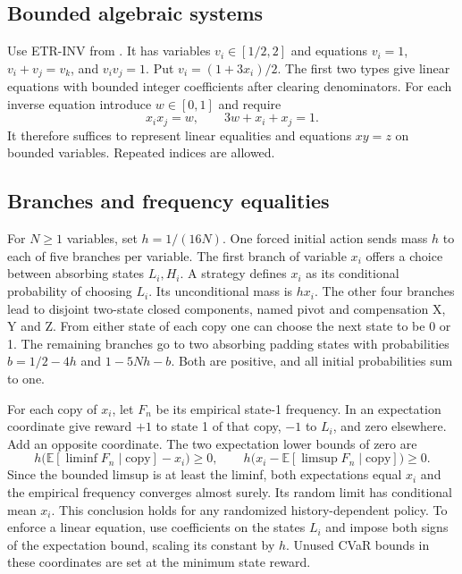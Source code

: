 \documentclass[11pt,a4paper]{amsart}
\begin{document}
\subsection{Bounded algebraic systems}
Use ETR-INV from \cite[Definition~14 and Theorem~16]{aam}. It has variables \(v_i\in[1/2,2]\) and equations \(v_i=1\), \(v_i+v_j=v_k\), and \(v_i v_j=1\). Put \(v_i=(1+3x_i)/2\). The first two types give linear equations with bounded integer coefficients after clearing denominators. For each inverse equation introduce \(w\in[0,1]\) and require
\[
 x_i x_j=w,\qquad 3w+x_i+x_j=1 .
\]
It therefore suffices to represent linear equalities and equations \(xy=z\) on bounded variables. Repeated indices are allowed.

\subsection{Branches and frequency equalities}
For \(N\ge1\) variables, set \(h=1/(16N)\). One forced initial action sends mass \(h\) to each of five branches per variable. The first branch of variable \(x_i\) offers a choice between absorbing states \(L_i,H_i\). A strategy defines \(x_i\) as its conditional probability of choosing \(L_i\). Its unconditional mass is \(hx_i\). The other four branches lead to disjoint two-state closed components, named pivot and compensation X, Y and Z. From either state of each copy one can choose the next state to be 0 or 1. The remaining branches go to two absorbing padding states with probabilities \(b=1/2-4h\) and \(1-5Nh-b\). Both are positive, and all initial probabilities sum to one.

For each copy of \(x_i\), let \(F_n\) be its empirical state-1 frequency. In an expectation coordinate give reward \(+1\) to state 1 of that copy, \(-1\) to \(L_i\), and zero elsewhere. Add an opposite coordinate. The two expectation lower bounds of zero are
\[
 h\bigl(\mathbb E[\liminf F_n\mid\mathrm{copy}]-x_i\bigr)\ge0,
 \qquad
 h\bigl(x_i-\mathbb E[\limsup F_n\mid\mathrm{copy}]\bigr)\ge0 .
\]
Since the bounded limsup is at least the liminf, both expectations equal \(x_i\) and the empirical frequency converges almost surely. Its random limit has conditional mean \(x_i\). This conclusion holds for any randomized history-dependent policy. To enforce a linear equation, use coefficients on the states \(L_i\) and impose both signs of the expectation bound, scaling its constant by \(h\). Unused CVaR bounds in these coordinates are set at the minimum state reward.
\end{document}

